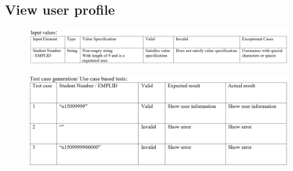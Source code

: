 \documentclass[english]{article}
\begin{document}
\subsection{View user profile}
\begin{figure}[ht!]
\hspace*{-2.5cm}
\includegraphics[width=180mm]{8.png}
\end{figure}
\begin{figure}[ht!]
\hspace*{-2.5cm}
\includegraphics[width=180mm]{ViewTestCase.png}
\end{figure}
\end{document}
